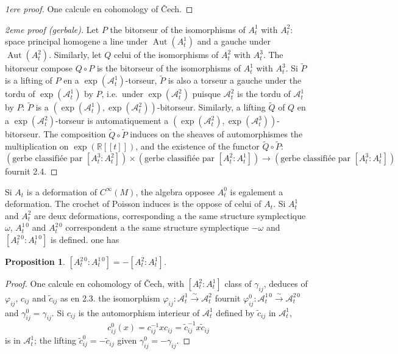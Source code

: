 \documentclass[11pt,a4paper]{article}
\theoremstyle{plain}
\newtheorem{proposition}[theorem]{Proposition}
\theoremstyle{definition}
\DeclareMathOperator{\Aut}{Aut}
\newcommand{\R}{\mathbb{R}}
\newcommand{\iso}{\xrightarrow{\sim}}
\begin{document}
\begin{proof}[1ere proof]
One calcule en cohomology of \v{C}ech.
\end{proof}

\begin{proof}[2eme proof (gerbale)]
Let $P$ the bitorseur of the isomorphisms of $A_{t}^{1}$ with $A_{t}^{2}$:
space principal homogene a line under $\Aut(A_{t}^{1})$ and a gauche under $\Aut(A_{t}^{2})$. Similarly, let $Q$ celui of the isomorphisms of $A_{t}^{2}$ with $A_{t}^{3}$. The bitorseur compose $Q \circ P$
is the bitorseur of the isomorphisms of $A_{t}^{1}$ with $A_{t}^{3}$. Si $\tilde{P}$ is a lifting of $P$ en
a $\exp(\mathcal{A}_{t}^{1})$-torseur, $\tilde{P}$ is also a torseur a gauche under the tordu of $\exp(\mathcal{A}_{t}^{1})$ by $P$,
i.e.\ under $\exp(\mathcal{A}_{t}^{2})$ puisque $\mathcal{A}_{t}^{2}$ is the tordu of $\mathcal{A}_{t}^{1}$ by $P$: $\tilde{P}$ is a $(\exp(\mathcal{A}_{t}^{1}), \exp(\mathcal{A}_{t}^{2}))$-bitorseur. Similarly, a lifting $\tilde{Q}$ of $Q$ en a $\exp(\mathcal{A}_{t}^{2})$-torseur is automatiquement
a $(\exp(\mathcal{A}_{t}^{2}), \exp(\mathcal{A}_{t}^{3}))$-bitorseur. The composition $\tilde{Q} \circ \tilde{P}$ induces on the sheaves
of automorphismes the multiplication on $\exp(\R[[t]])$, and the existence of the functor $\tilde{Q} \circ \tilde{P}$:
\[
(\text{gerbe classifi\'ee par } [A_{t}^{3} : A_{t}^{2}]) \times (\text{gerbe classifi\'ee par } [A_{t}^{2} : A_{t}^{1}]) \longrightarrow (\text{gerbe classifi\'ee par } [A_{t}^{3} : A_{t}^{1}])
\]
fournit 2.4.
\end{proof}

Si $A_{t}$ is a deformation of $C^{\infty}(M)$, the algebra opposee $A_{t}^{0}$ is egalement a deformation. The crochet of Poisson induces is the oppose of celui of $A_{t}$. Si $A_{t}^{1}$ and $A_{t}^{2}$
are deux deformations, corresponding a the same structure symplectique $\omega$, $A_{t}^{1\,0}$ and
$A_{t}^{2\,0}$ correspondent a the same structure symplectique $-\omega$ and $[A_{t}^{2\,0} : A_{t}^{1\,0}]$ is defined.
one has

\begin{proposition}
$[A_{t}^{2\,0} : A_{t}^{1\,0}] = -[A_{t}^{2} : A_{t}^{1}]$.
\end{proposition}

\begin{proof}
One calcule en cohomology of \v{C}ech, with $[A_{t}^{2} : A_{t}^{1}]$ class of $\gamma_{ij}$, deduces of
$\varphi_{ij}$, $c_{ij}$ and $\tilde{c}_{ij}$ as en 2.3. the isomorphism $\varphi_{ij}: \mathcal{A}_{t}^{1} \iso \mathcal{A}_{t}^{2}$ fournit $\varphi_{ij}^{0}: \mathcal{A}_{t}^{1\,0} \iso \mathcal{A}_{t}^{2\,0}$ and $\gamma_{ij}^{0} = \gamma_{ij}$. Si $c_{ij}$ is the automorphism interieur of $\mathcal{A}_{t}^{1}$ defined by $\tilde{c}_{ij}$ in $\mathcal{A}_{t}^{1}$,
\[
c_{ij}^{0}(x) = c_{ij}^{-1} x c_{ij} = \tilde{c}_{ij}^{-1} x \tilde{c}_{ij}
\]
is in $\mathcal{A}_{t}^{1}$; the lifting $\tilde{c}_{ij}^{0} = -\tilde{c}_{ij}$ given $\gamma_{ij}^{0} = -\gamma_{ij}$.
\end{proof}
\end{document}
